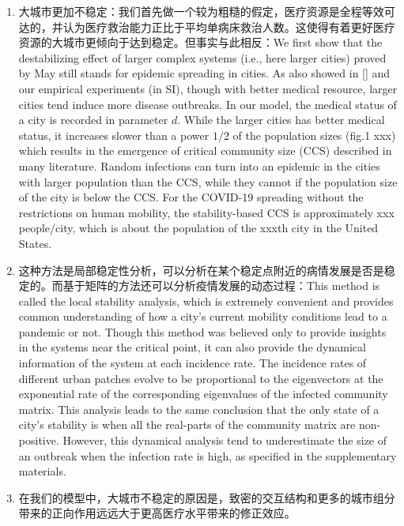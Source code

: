 \begin{enumerate}
    \item 大城市更加不稳定：我们首先做一个较为粗糙的假定，医疗资源是全程等效可达的，并认为医疗救治能力正比于平均单病床救治人数。这使得有着更好医疗资源的大城市更倾向于达到稳定。但事实与此相反：We first show that the destabilizing effect of larger complex systems (i.e., here larger cities) proved by May still stands for epidemic spreading in cities. As also showed in [] and our empirical experiments (in SI), though with better medical resource, larger cities tend induce more disease outbreaks. In our model, the medical status of a city is recorded in parameter $d$. While the larger cities has better medical status, it increases slower than a power $1/2$ of the population sizes (fig.1 xxx) which results in the emergence of critical community size (CCS) described in many literature. Random infections can turn into an epidemic in the cities with larger population than the CCS, while they cannot if the population size of the city is below the CCS. For the COVID-19 spreading without the restrictions on human mobility, the stability-based CCS is approximately xxx people/city, which is about the population of the xxxth city in the United States.
    \item 这种方法是局部稳定性分析，可以分析在某个稳定点附近的病情发展是否是稳定的。而基于矩阵的方法还可以分析疫情发展的动态过程：This method is called the local stability analysis, which is extremely convenient and provides common understanding of how a city’s current mobility conditions lead to a pandemic or not. Though this method was believed only to provide insights in the systems near the critical point, it can also provide the dynamical information of the system at each incidence rate. The incidence rates of different urban patches evolve to be proportional to the eigenvectors at the exponential rate of the corresponding eigenvalues of the infected community matrix. This analysis leads to the same conclusion that the only state of a city’s stability is when all the real-parts of the community matrix are non-positive. However, this dynamical analysis tend to underestimate the size of an outbreak when the infection rate is high, as specified in the supplementary materials.
    \item 在我们的模型中，大城市不稳定的原因是，致密的交互结构和更多的城市组分带来的正向作用远远大于更高医疗水平带来的修正效应。
\end{enumerate}